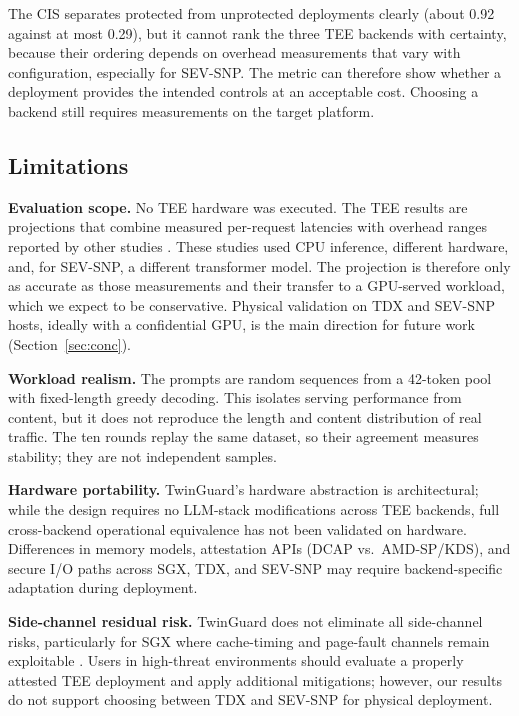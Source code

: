 \documentclass{ieeeaccess}
\begin{document}
The CIS separates protected from unprotected deployments clearly (about 0.92
against at most 0.29), but it cannot rank the three TEE backends with
certainty, because their ordering depends on overhead measurements that vary
with configuration, especially for SEV-SNP. The metric can therefore show
whether a deployment provides the intended controls at an acceptable cost.
Choosing a backend still requires measurements on the target platform.

\subsection{Limitations}

\textbf{Evaluation scope.} No TEE hardware was executed. The TEE results are
projections that combine measured per-request latencies with overhead ranges
reported by other studies \cite{chrapek2025confidential, misono2024cvm}.
These studies used CPU inference, different hardware, and, for SEV-SNP, a
different transformer model. The projection is therefore only as accurate as
those measurements and their transfer to a GPU-served workload, which we
expect to be conservative. Physical validation on TDX and SEV-SNP hosts,
ideally with a confidential GPU, is the main direction for future work
(Section~\ref{sec:conc}).

\textbf{Workload realism.} The prompts are random sequences from a 42-token pool
with fixed-length greedy decoding. This isolates serving performance from
content, but it does not reproduce the length and content distribution of real
traffic. The ten rounds replay the same dataset, so their agreement measures
stability; they are not independent samples.

\textbf{Hardware portability.} TwinGuard's hardware abstraction is
architectural; while the design requires no LLM-stack modifications across
TEE backends, full cross-backend operational equivalence has not been validated on
hardware. Differences
in memory models, attestation APIs (DCAP vs.\ AMD-SP/KDS), and secure
I/O paths across SGX, TDX, and SEV-SNP may require backend-specific
adaptation during deployment.

\textbf{Side-channel residual risk.} TwinGuard does not eliminate all
side-channel risks, particularly for SGX where cache-timing and page-fault
channels remain exploitable \cite{brasser2017software, xu2015controlled}.
Users in high-threat environments should evaluate a properly attested TEE deployment and apply additional mitigations; however, our results do not support
choosing between TDX and SEV-SNP for physical deployment.
\end{document}
